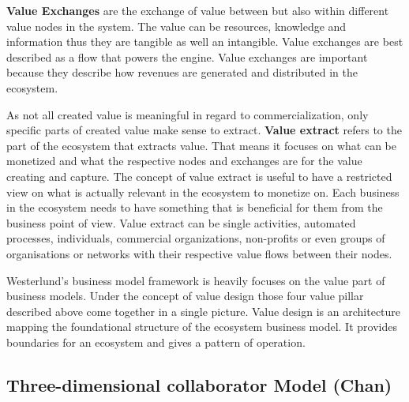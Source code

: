 		\textbf{Value Exchanges} are the exchange of value between but also within different value nodes in the system. The value can be resources, knowledge and information thus they are tangible as well an intangible. Value exchanges are best described as a flow that powers the engine. Value exchanges are important because they describe how revenues are generated and distributed in the ecosystem.

		As not all created value is meaningful in regard to commercialization, only specific parts of created value make sense to extract. \textbf{Value extract} refers to the part of the ecosystem that extracts value. That means it focuses on what can be monetized and what the respective nodes and exchanges are for the value creating and capture. The concept of value extract is useful to have a restricted view on what is actually relevant in the ecosystem to monetize on. Each business in the ecosystem needs to have something that is beneficial for them from the business point of view. Value extract can be single activities, automated processes, individuals, commercial organizations, non-profits or even groups of organisations or networks with their respective value flows between their nodes.

		Westerlund's business model framework is heavily focuses on the value part of business models. Under the concept of value design those four value pillar described above come together in a single picture. Value design is an architecture mapping the foundational structure of the ecosystem business model. It provides boundaries for an ecosystem and gives a pattern of operation.
		
		\subsection{Three-dimensional collaborator Model (Chan)}




